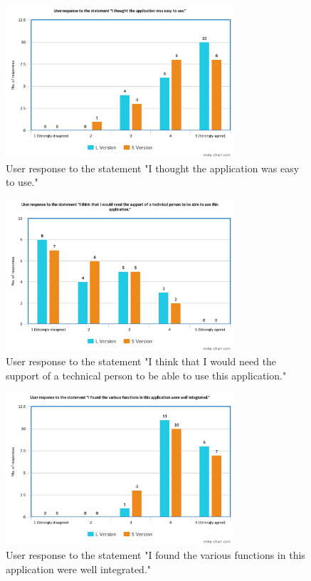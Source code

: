 \documentclass[journal]{./IEEE/IEEEtran}
\begin{document}
\begin{figure}[!ht]
\begin{center}

\includegraphics[width=85mm]{images/s3.png}
\caption{User response to the statement "I thought the application was easy to use."}

\end{center}
\end{figure}

\begin{figure}[!ht]
\begin{center}

\includegraphics[width=85mm]{images/s4.png}
\caption{User response to the statement "I think that I would need the support of a technical person to be able to use this application."}

\end{center}
\end{figure}

\begin{figure}[!ht]
\begin{center}

\includegraphics[width=85mm]{images/s5.png}
\caption{User response to the statement "I found the various functions in this application were well integrated."}

\end{center}
\end{figure}
\end{document}
